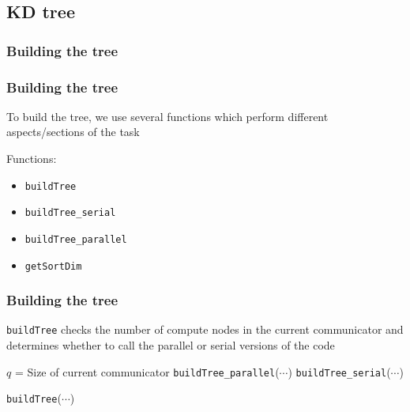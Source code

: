 \documentclass{beamer}
\begin{document}
\subsection{KD tree}





\subsubsection{Building the tree}

\begin{frame}
	\frametitle{Building the tree}
	
	To build the tree, we use several functions which perform different aspects/sections of the task
	
	\vspace{10pt}
	
	\begin{block}{Functions:}
		\begin{itemize}
			\item \texttt{buildTree}
			\item \texttt{buildTree\_serial}
			\item \texttt{buildTree\_parallel}
			\item \texttt{getSortDim}
		\end{itemize}
	\end{block}
\end{frame}

\begin{frame}
	\frametitle{Building the tree}
	
	\texttt{buildTree} checks the number of compute nodes in the current communicator and determines whether to call the parallel or serial versions of the code
	
	\vspace{10pt}
	
	\begin{algorithm}[H]
		\begin{algorithmic}[1]
			\STATE $q$ = Size of current communicator
				\STATE \texttt{buildTree\_parallel}($\cdots$)
			\ELSE
				\STATE \texttt{buildTree\_serial}($\cdots$)
			\ENDIF
		\end{algorithmic}
	\caption{\texttt{buildTree}($\cdots$)}
	\end{algorithm}
		
\end{frame}
\end{document}

